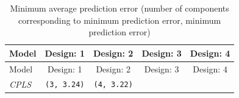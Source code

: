 \documentclass[12pt,A4paper,authoryear]{elsarticle} %
\theoremstyle{definition}
\theoremstyle{definition}
\theoremstyle{remark}
\begin{document}
\begin{longtable}[]{@{}lcccc@{}}
\caption{\label{tab:min-error} Minimum average prediction error (number of
components corresponding to minimum prediction error, minimum prediction
error)}\tabularnewline
\toprule
\begin{minipage}[b]{0.09\columnwidth}\raggedright\strut
Model\strut
\end{minipage} & \begin{minipage}[b]{0.19\columnwidth}\centering\strut
Design: 1\strut
\end{minipage} & \begin{minipage}[b]{0.19\columnwidth}\centering\strut
Design: 2\strut
\end{minipage} & \begin{minipage}[b]{0.19\columnwidth}\centering\strut
Design: 3\strut
\end{minipage} & \begin{minipage}[b]{0.19\columnwidth}\centering\strut
Design: 4\strut
\end{minipage}\tabularnewline
\midrule
\endfirsthead
\toprule
\begin{minipage}[b]{0.09\columnwidth}\raggedright\strut
Model\strut
\end{minipage} & \begin{minipage}[b]{0.19\columnwidth}\centering\strut
Design: 1\strut
\end{minipage} & \begin{minipage}[b]{0.19\columnwidth}\centering\strut
Design: 2\strut
\end{minipage} & \begin{minipage}[b]{0.19\columnwidth}\centering\strut
Design: 3\strut
\end{minipage} & \begin{minipage}[b]{0.19\columnwidth}\centering\strut
Design: 4\strut
\end{minipage}\tabularnewline
\midrule
\endhead
\begin{minipage}[t]{0.09\columnwidth}\raggedright\strut
\emph{CPLS}\strut
\end{minipage} & \begin{minipage}[t]{0.19\columnwidth}\centering\strut
\texttt{(3,\ 3.24)}\strut
\end{minipage} & \begin{minipage}[t]{0.19\columnwidth}\centering\strut
\texttt{(4,\ 3.22)}\strut
\end{minipage} & \begin{minipage}[t]{0.19\columnwidth}\centering\strut

\end{minipage}
\end{longtable}
\end{document}
